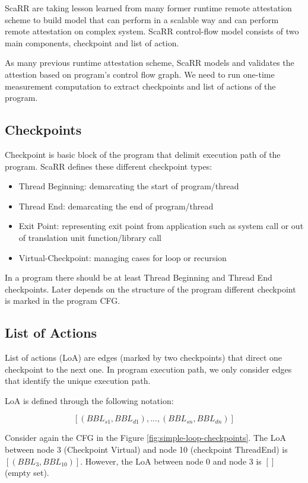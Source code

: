 ScaRR \cite{toffaliniScaRRScalableRuntime2019} are taking lesson learned from many former runtime remote attestation scheme to build model that can perform in a scalable way and can perform remote attestation on complex system. ScaRR control-flow model consists of two main components, checkpoint and list of action. 

As many previous runtime attestation scheme, ScaRR models and validates the attestion based on program's control flow graph. We need to run one-time measurement computation to extract checkpoints and list of actions of the program.

\subsection{Checkpoints} \label{sec:scarr-checkpoints}
Checkpoint is basic block of the program that delimit execution path of the program. ScaRR defines these different checkpoint types:
\begin{itemize}
    \item Thread Beginning: demarcating the start of program/thread
    \item Thread End: demarcating the end of program/thread
    \item Exit Point: representing exit point from application such as system call or out of translation unit function/library call
    \item Virtual-Checkpoint: managing cases for loop or recursion
\end{itemize}

In a program there should be at least Thread Beginning and Thread End checkpoints. Later depends on the structure of the program different checkpoint is marked in the program CFG.

\subsection{List of Actions}

List of actions (LoA) are edges (marked by two checkpoints) that direct one checkpoint to the next one. In program execution path, we only consider edges that identify the unique execution path.

LoA is defined through the following notation:

$$[(BBL_{s1},BBL_{d1}),...,(BBL_{sn},BBL_{dn})]$$

Consider again the CFG in the Figure \ref{fig:simple-loop-checkpoints}. The LoA between node 3 (Checkpoint Virtual) and node 10 (checkpoint ThreadEnd) is  $[(BBL_3, BBL_{10})]$. However, the LoA between node 0 and node 3 is $[]$ (empty set).

